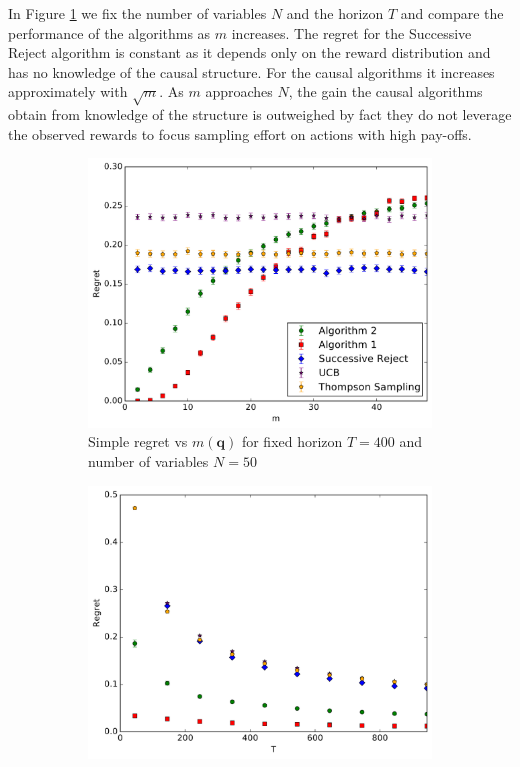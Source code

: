 \documentclass[11pt,a4paper,twoside]{report}
\theoremstyle{plain}
\theoremstyle{definition}
\begin{document}
In Figure \ref{fig:simple_vs_m} we fix the number of variables $N$ and the horizon $T$ and compare the performance of the algorithms as $m$ increases. The regret for the Successive Reject algorithm is constant as it depends only on the reward distribution and has no knowledge of the causal structure. For the causal algorithms it increases approximately with $\sqrt{m}$. As $m$ approaches $N$, the gain the causal algorithms obtain from knowledge of the structure is outweighed by fact they do not leverage the observed rewards to focus sampling effort on actions with high pay-offs.


\begin{figure}[ht]
    \begin{subfigure}[t]{0.3\textwidth}
		\centering    
    		\includegraphics[width=\textwidth]{experiment1_20161020_1247.pdf}
    		\caption{Simple regret vs $m(\boldsymbol{q})$ for fixed horizon $T=400$ and number of variables $N = 50$}
        \label{fig:simple_vs_m}
    \end{subfigure}\hfill
    \begin{subfigure}[t]{0.3\textwidth}
    		\centering
        \includegraphics[width=\textwidth]{experiment2_20161020_1249.pdf}

\end{subfigure}
\end{figure}
\end{document}
